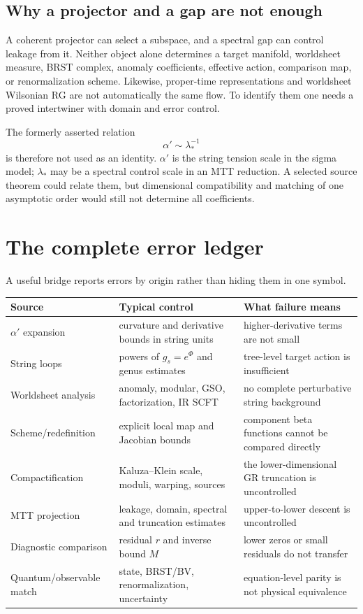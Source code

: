 \documentclass[11pt]{article}
\newcommand{\alphap}{\alpha'}
\begin{document}
\subsection{Why a projector and a gap are not enough}

A coherent projector can select a subspace, and a spectral gap can control
leakage from it.  Neither object alone determines a target manifold,
worldsheet measure, BRST complex, anomaly coefficients, effective action,
comparison map, or renormalization scheme.  Likewise, proper-time
representations and worldsheet Wilsonian RG are not automatically the same
flow.  To identify them one needs a proved intertwiner with domain and error
control.

The formerly asserted relation
\[
\alphap\sim\lambda_*^{-1}
\]
is therefore not used as an identity.  \(\alphap\) is the string tension
scale in the sigma model; \(\lambda_*\) may be a spectral control scale in an
MTT reduction.  A selected source theorem could relate them, but dimensional
compatibility and matching of one asymptotic order would still not determine
all coefficients.

\section{The complete error ledger}

A useful bridge reports errors by origin rather than hiding them in one
symbol.

\begin{center}
\small
\begin{tabular}{@{}p{}p{}p{}@{}}
\toprule
Source & Typical control & What failure means\\
\midrule
\(\alphap\) expansion & curvature and derivative bounds in string units &
higher-derivative terms are not small\\
String loops & powers of \(g_s=e^\Phi\) and genus estimates & tree-level
target action is insufficient\\
Worldsheet analysis & anomaly, modular, GSO, factorization, IR SCFT &
no complete perturbative string background\\
Scheme/redefinition & explicit local map and Jacobian bounds & component
beta functions cannot be compared directly\\
Compactification & Kaluza--Klein scale, moduli, warping, sources & the
lower-dimensional GR truncation is uncontrolled\\
MTT projection & leakage, domain, spectral and truncation estimates &
upper-to-lower descent is uncontrolled\\
Diagnostic comparison & residual \(r\) and inverse bound \(M\) & lower
zeros or small residuals do not transfer\\
Quantum/observable match & state, BRST/BV, renormalization, uncertainty &
equation-level parity is not physical equivalence\\
\bottomrule
\end{tabular}
\end{center}
\end{document}
